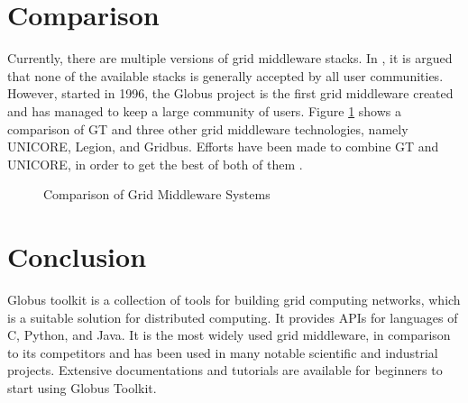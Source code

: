 \documentclass[9pt,twocolumn,twoside]{../../styles/osajnl}
\begin{document}
\section{Comparison}
Currently, there are multiple versions of grid middleware stacks. In \cite{schwiegelshohn2010perspectives}, it is argued that none of the available stacks is generally accepted
by all user communities. However, started in 1996, the Globus project is the first grid middleware created \cite{www-uchigago} and has managed to keep a large community of users. Figure \ref{fig:comp-table} shows a comparison of GT and three other grid middleware technologies, namely UNICORE, Legion, and Gridbus. Efforts have been made to combine GT and UNICORE, in order to get the best of both of them \cite{rambadt2002unicore}.
\begin{figure}[htbp]
\centering
{}
\caption{Comparison of Grid Middleware Systems \cite{asadzadeh2005global}}
\label{fig:comp-table}
\end{figure}

\section{Conclusion}
Globus toolkit is a collection of tools for building grid computing networks, which is a suitable solution for distributed computing. 
It provides APIs for languages of C, Python, and Java. It is the most widely used grid middleware, in comparison to its competitors 
and has been used in many notable scientific and industrial projects. Extensive documentations and tutorials are available for beginners to start using Globus Toolkit.
\end{document}

